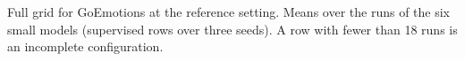 \begin{table}[t]
  \centering
  \footnotesize
  
  \caption{Full grid for GoEmotions at the reference setting. Means over the runs of the six small models (supervised rows over three seeds). A row with fewer than 18 runs is an incomplete configuration.}
  \label{tab:grid_go}
\end{table}
